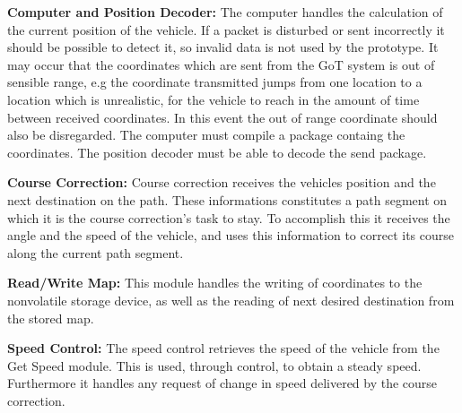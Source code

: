 \textbf{Computer and Position Decoder:}
The computer handles the calculation of the current position of the vehicle. If a packet is disturbed or sent incorrectly it should be possible to detect it, so invalid data is not used by the prototype. It may occur that the coordinates which are sent from the GoT system is out of sensible range, e.g the coordinate transmitted jumps from one location to a location which is unrealistic, for the vehicle to reach in the amount of time between received coordinates. In this event the out of range coordinate should also be disregarded. The computer must compile a package containg the coordinates. The position decoder must be able to decode the send package.

\textbf{Course Correction:}
Course correction receives the vehicles position and the next destination on the path. These informations constitutes a path segment on which it is the course correction's task to stay. To accomplish this it receives the angle and the speed of the vehicle, and uses this information to correct its course along the current path segment.

\textbf{Read/Write Map:}
This module handles the writing of coordinates to the nonvolatile storage device, as well as the reading of next desired destination from the stored map.

\textbf{Speed Control:}
The speed control retrieves the speed of the vehicle from the Get Speed module. This is used, through control, to obtain a steady speed. Furthermore it handles any request of change in speed delivered by the course correction.



